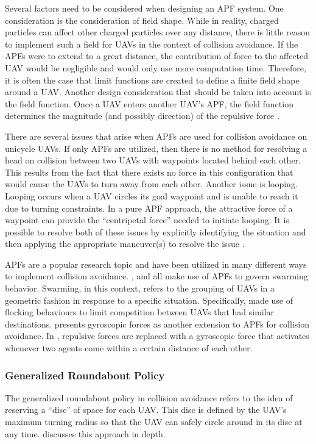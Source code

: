 \documentclass[conference]{IEEEtran}
\begin{document}
Several factors need to be considered when designing an APF system.  One consideration is the consideration of field shape.  While in reality, charged particles can affect other charged particles over any distance, there is little reason to implement such a field for UAVs in the context of collision avoidance.  If the APFs were to extend to a great distance, the contribution of force to the affected UAV would be negligible and would only use more computation time.  Therefore, it is often the case that limit functions are created to define a finite field shape around a UAV.  Another design consideration that should be taken into account is the field function.  Once a UAV enters another UAV’s APF, the field function determines the magnitude (and possibly direction) of the repulsive force \cite{khatib1985real}.

There are several issues that arise when APFs are used for collision avoidance on unicycle UAVs.  If only APFs are utilized, then there is no method for resolving a head on collision between two UAVs with waypoints located behind each other.  This results from the fact that there exists no force in this configuration that would cause the UAVs to turn away from each other.  Another issue is looping.  Looping occurs when a UAV circles its goal waypoint and is unable to reach it due to turning constraints.  In a pure APF approach, the attractive force of a waypoint can provide the “centripetal force” needed to initiate looping.  It is possible to resolve both of these issues by explicitly identifying the situation and then applying the appropriate maneuver(s) to resolve the issue \cite{ruchti2011uav}.

APFs are a popular research topic and have been utilized in many different ways to implement collision avoidance.   \cite{ruchti2011uav}, \cite{balch2000social} and \cite{barnes2006swarm} all make use of APFs to govern swarming behavior.  Swarming, in this context, refers to the grouping of UAVs in a geometric fashion in response to a specific situation. Specifically,  \cite{ruchti2011uav} made use of flocking behaviours to limit competition between UAVs that had similar destinations.  \cite{chang2003collision} presents gyroscopic forces as another extension to APFs for collision avoidance.  In \cite{chang2003collision}, repulsive forces are replaced with a gyroscopic force that activates whenever two agents come within a certain distance of each other.

\subsubsection{Generalized Roundabout Policy}
The generalized roundabout policy in collision avoidance refers to the idea of reserving a “disc” of space for each UAV.  This disc is defined by the UAV’s maximum turning radius so that the UAV can safely circle around in its disc at any time. \cite{pallottino2006probabilistic} discusses this approach in depth.
\end{document}
